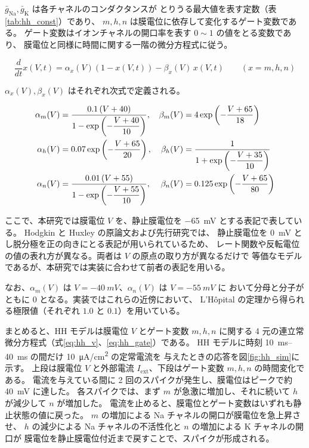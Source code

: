 \documentclass[a4paper,11pt,openany]{ltjsreport}
\newcommand{\Iext}{I_{\mathrm{ext}}}
\begin{document}
$\bar{g}_{\mathrm{Na}}, \bar{g}_{\mathrm{K}}$ は各チャネルのコンダクタンスが
とりうる最大値を表す定数（表\ref{tab:hh_const}）であり、
$m, h, n$ は膜電位に依存して変化するゲート変数である。
ゲート変数はイオンチャネルの開口率を表す $0 \sim 1$ の値をとる変数であり、
膜電位と同様に時間に関する一階の微分方程式に従う。

\begin{equation}
  \frac{d}{dt}x(V,t) = \alpha_x(V)\left(1 - x(V,t)\right) - \beta_x(V)\, x(V,t)
  \qquad (x = m, h, n)
  \label{eq:hh_gate}
\end{equation}

$\alpha_x(V), \beta_x(V)$ はそれぞれ次式で定義される。

\begin{align}
  \alpha_m(V) &= \frac{0.1\,(V + 40)}{1 - \exp\left(-\dfrac{V + 40}{10}\right)}, &
  \beta_m(V)  &= 4\exp\left(-\frac{V + 65}{18}\right) \notag\\
  \alpha_h(V) &= 0.07\exp\left(-\frac{V + 65}{20}\right), &
  \beta_h(V)  &= \frac{1}{1 + \exp\left(-\dfrac{V + 35}{10}\right)} \label{eq:rate}\\
  \alpha_n(V) &= \frac{0.01\,(V + 55)}{1 - \exp\left(-\dfrac{V + 55}{10}\right)}, &
  \beta_n(V)  &= 0.125\exp\left(-\frac{V + 65}{80}\right) \notag
\end{align}

ここで、本研究では膜電位 $V$ を、静止膜電位を \SI{-65}{mV} とする表記で表している。
Hodgkin と Huxley の原論文\cite{hodgkin1952}および先行研究\cite{munechika2025}では、
静止膜電位を \SI{0}{mV} とし脱分極を正の向きにとる表記が用いられているため、
レート関数や反転電位の値の表れ方が異なる。両者は $V$ の原点の取り方が異なるだけで
等価なモデルであるが、本研究では実装に合わせて前者の表記を用いる。

なお、$\alpha_m(V)$ は $V = \SI{-40}{mV}$、$\alpha_n(V)$ は $V = \SI{-55}{mV}$ に
おいて分母と分子がともに $0$ となる。実装ではこれらの近傍において、
L'H\^{o}pital の定理から得られる極限値（それぞれ $1.0$ と $0.1$）を用いている。

まとめると、HH モデルは膜電位 $V$ とゲート変数 $m, h, n$ に関する
4 元の連立常微分方程式（式\eqref{eq:hh_v}、\eqref{eq:hh_gate}）である。
HH モデルに時刻 \SIrange{10}{40}{ms} の間だけ \SI{10}{\micro A/cm^2} の定常電流を
与えたときの応答を図\ref{fig:hh_sim}に示す。
上段は膜電位 $V$ と外部電流 $\Iext$、下段はゲート変数 $m, h, n$ の時間変化である。
電流を与えている間に 2 回のスパイクが発生し、膜電位はピークで約 \SI{40}{mV} に達した。
各スパイクでは、まず $m$ が急激に増加し、それに続いて $h$ が減少して $n$ が増加した。
電流を止めると、膜電位とゲート変数はいずれも静止状態の値に戻った。
$m$ の増加による Na チャネルの開口が膜電位を急上昇させ、
$h$ の減少による Na チャネルの不活性化と $n$ の増加による K チャネルの開口が
膜電位を静止膜電位付近まで戻すことで、スパイクが形成される。
\end{document}

